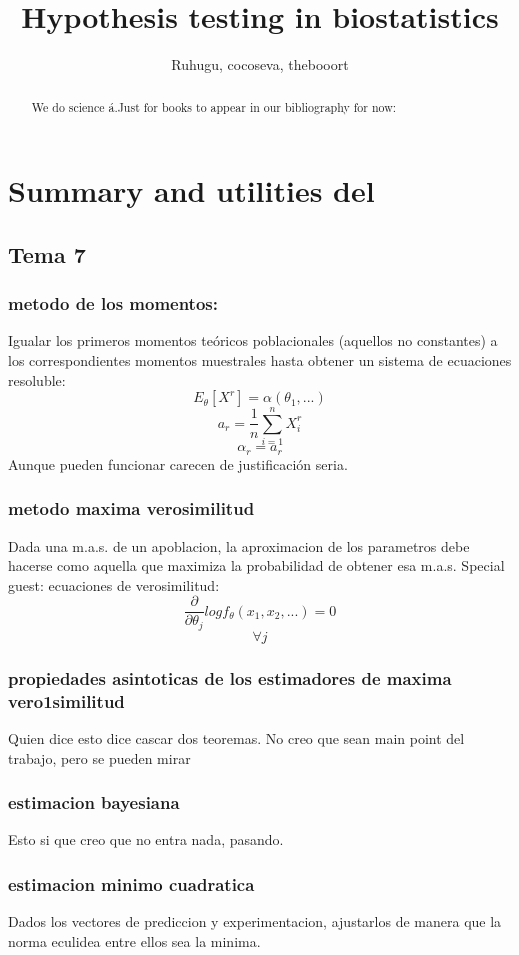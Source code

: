 \documentclass[a4paper,12pt]{article}
\title{Hypothesis testing in biostatistics}
\author{Ruhugu, cocoseva, thebooort}
\begin{document}
\maketitle

\begin{abstract}
We do science á.Just for books to appear in our bibliography for now:
\cite{velez1993principios} \cite{rosner2015fundamentals}
\end{abstract}

\section{Summary and utilities del \cite{velez1993principios} }
\subsection{Tema 7}
\subsubsection{metodo de los momentos:}
Igualar los primeros momentos teóricos poblacionales (aquellos no constantes) a los correspondientes momentos muestrales hasta obtener un sistema de ecuaciones resoluble:
$$E_\theta[X^r]=\alpha(\theta_1,...)$$
$$a_r=\frac{1}{n}\sum_{i=1}^{n}X_i^r$$
$$\alpha_r=a_r $$
Aunque pueden funcionar carecen de justificación seria.
\subsubsection{metodo maxima verosimilitud}
Dada una m.a.s. de un apoblacion, la aproximacion de los parametros debe hacerse como aquella que maximiza la probabilidad de obtener esa m.a.s.
Special guest: ecuaciones de verosimilitud:
$$\frac{\partial}{\partial\theta_j}log f_\theta(x_1,x_2,...)=0$$
$$\forall j$$
\subsubsection{propiedades asintoticas de los estimadores de maxima vero1similitud}
Quien dice esto dice cascar dos teoremas. No creo que sean main point del trabajo, pero se pueden mirar
\subsubsection{estimacion bayesiana}
Esto si que creo que no entra nada, pasando.
\subsubsection{estimacion minimo cuadratica}
Dados los vectores de prediccion y experimentacion, ajustarlos de manera que la norma eculidea entre ellos sea la minima. 
\end{document}
